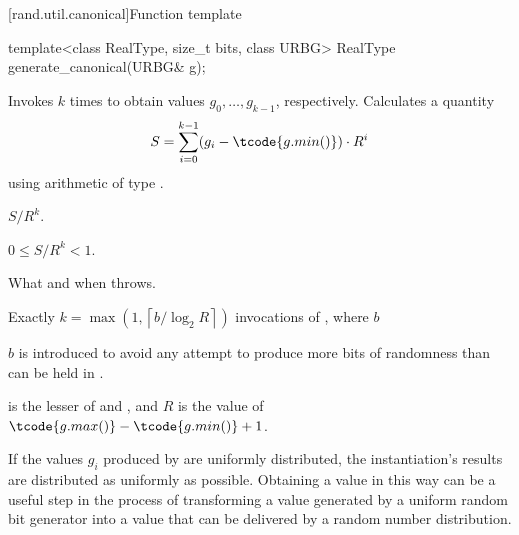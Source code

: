 
[rand.util.canonical]{Function template }%

%
\begin{itemdecl}
template<class RealType, size_t bits, class URBG>
  RealType generate_canonical(URBG& g);
\end{itemdecl}

\begin{itemdescr}
\pnum
\effects
 Invokes  $k$ times
 to obtain values $g_0, \dotsc, g_{k-1}$, respectively.
 Calculates a quantity
 \[
   S = \sum_{i=0}^{k-1} (g_i - \tcode{g.min()})
                        \cdot R^i
 \]
 using arithmetic of type
 .

\pnum
\returns
$S / R^k$.
\begin{note}
$0 \leq S / R^k < 1$.
\end{note}

\pnum
\throws
What and when  throws.

\pnum
\complexity
Exactly
 $k = \max(1, \left\lceil b / \log_2 R \right\rceil)$
 invocations
 of ,
 where $b$
\begin{footnote}
$b$ is introduced
   to avoid any attempt
   to produce more bits of randomness
   than can be held in .
\end{footnote}
   is the lesser of 
                and ,
 and
   $R$ is the value of $\tcode{g.max()} - \tcode{g.min()} + 1$.

\pnum
\begin{note}
If the values $g_i$ produced by  are uniformly distributed,
the instantiation's results are distributed as uniformly as possible.
Obtaining a value in this way
can be a useful step
in the process of transforming
a value generated by a uniform random bit generator
into a value
that can be delivered by a random number distribution.
\end{note}
\end{itemdescr}






